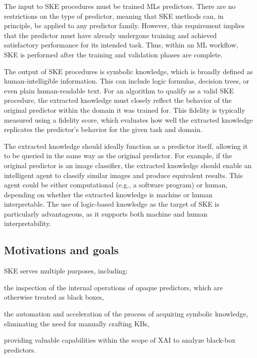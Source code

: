 The input to \gls{SKE} procedures must be trained \glspl{ML} predictors.
%
There are no restrictions on the type of predictor, meaning that \gls{SKE} methods can, in principle, be applied to any predictor family.
%
However, this requirement implies that the predictor must have already undergone training and achieved satisfactory performance for its intended task.
%
Thus, within an \gls{ML} workflow, \gls{SKE} is performed after the training and validation phases are complete.

The output of \gls{SKE} procedures is symbolic knowledge, which is broadly defined as human-intelligible information.
%
This can include logic formulas, decision trees, or even plain human-readable text.
%
For an algorithm to qualify as a valid \gls{SKE} procedure, the extracted knowledge must closely reflect the behavior of the original predictor within the domain it was trained for.
%
This fidelity is typically measured using a fidelity score, which evaluates how well the extracted knowledge replicates the predictor's behavior for the given task and domain.

The extracted knowledge should ideally function as a predictor itself, allowing it to be queried in the same way as the original predictor.
%
For example, if the original predictor is an image classifier, the extracted knowledge should enable an intelligent agent to classify similar images and produce equivalent results.
%
This agent could be either computational (e.g., a software program) or human, depending on whether the extracted knowledge is machine or human interpretable.
%
The use of logic-based knowledge as the target of \gls{SKE} is particularly advantageous, as it supports both machine and human interpretability.


\subsection{Motivations and goals}\label{subsec:ske-motivations-and-goals}
%
\Gls{SKE} serves multiple purposes, including:
%
\begin{inlinelist}
    \item \label{itm:inspection} the inspection of the internal operations of opaque predictors, which are otherwise treated as black boxes,
    \item \label{itm:automation} the automation and acceleration of the process of acquiring symbolic knowledge, eliminating the need for manually crafting \glspl{KB},
    \item \label{itm:xai} providing valuable capabilities within the scope of \gls{XAI} to analyze black-box predictors.
\end{inlinelist}

